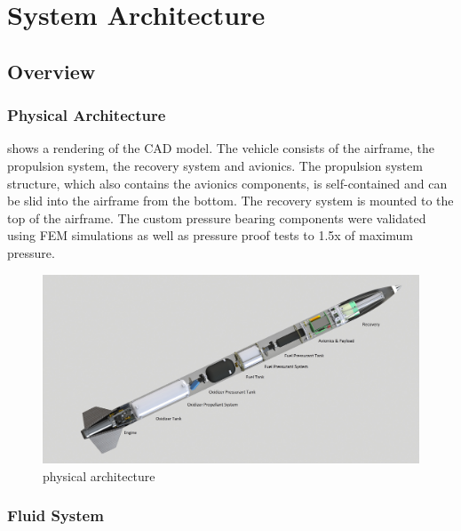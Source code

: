 \chapter{System Architecture}
\label{chap:sysarch}

\section{Overview}

\subsection{Physical Architecture}
 shows a rendering of the \uH CAD model. The vehicle consists of the airframe, the propulsion system, the recovery system and avionics. The propulsion system structure, which also contains the avionics components, is self-contained and can be slid into the airframe from the bottom. The recovery system is mounted to the top of the airframe. The custom pressure bearing components were validated using FEM simulations as well as pressure proof tests to 1.5x of maximum pressure.

\begin{figure}[h]
    \centering
    \includegraphics[width=\textwidth]{SysArch/uHb_render.jpg}
    \caption{\uH physical architecture}
    \label{fig:sysarch_cad}
\end{figure}

\subsection{Fluid System}\label{sec:sysarch_fluidSystem}

